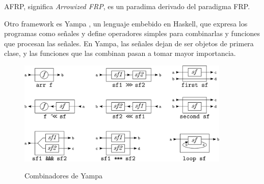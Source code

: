 
  AFRP, significa \textit{Arrowized FRP}, es un paradima derivado del
paradigma FRP.

  Otro framework es Yampa \cite{yampa},
un lenguaje embebido en Haskell, que expresa los programas como señales y
define operadores simples para combinarlas y funciones que
procesan las señales.
  En Yampa, las señales dejan de ser objetos de primera clase,
y las funciones que las combinan pasan a tomar mayor importancia.

\begin{figure}[h]
\begin{center}
\caption{Combinadores de Yampa}
\includegraphics[width=0.9\textwidth]{graphs/yampasf.png}
\label{fig:compilacion}
\end{center}
\end{figure}


